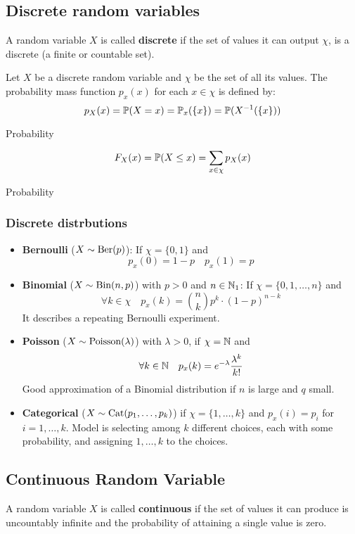 \subsection{Discrete random variables}
A random variable \(X\) is called \textbf{discrete} if the set of values it can output \(\chi\), is a discrete (a finite or countable set).

\begin{ddefinition*}
  Let \(X\) be a discrete random variable and \(\chi\) be the set of all its values. The probability mass function \(p_x(x)\) for each \(x \in \chi\) is defined by:
  \[p_X(x) = \P(X = x) = \P_x(\{x\}) = \P(X^{-1}(\{x\}))\]
\end{ddefinition*}
Probability
\begin{ddefinition*}
  \[F_X(x) = \P(X \leq x) = \sum_{x \in \chi} p_X(x)\]
\end{ddefinition*}Probability

\subsubsection{Discrete distrbutions}
\begin{itemize}
  \item \textbf{Bernoulli} (\(X \sim \Ber(p)\)): If \(\chi = \{0, 1\}\) and
  \[p_x(0) = 1 - p \quad p_x(1) = p\]

  \item \textbf{Binomial} (\(X \sim \Bin(n, p)\)) with \(p > 0\) and \(n \in \N_1\): If \(\chi = \{0, 1, \ldots, n\}\) and
  \[\forall k \in \chi \quad p_x(k) = \binom{n}{k} p^k \cdot (1 - p)^{n -k}\]
  It describes a repeating Bernoulli experiment.

  \item \textbf{Poisson} (\(X \sim \Poisson(\lambda)\)) with \(\lambda > 0\), if \(\chi = \N\) and
  \[\forall k \in \N \quad p_x(k) = e^{-\lambda} \frac{\lambda^k}{k!}\]
  Good approximation of a Binomial distribution if \(n\) is large and \(q\) small.

  \item \textbf{Categorical} (\(X \sim \Cat(p_1, \ldots, p_k)\)) if \(\chi = \{1, \ldots, k\}\) and \(p_x(i) = p_i\) for \(i = 1, \ldots, k\). Model is selecting among \(k\) different choices, each with some probability, and assigning \(1, \ldots, k\) to the choices.
\end{itemize}

\pagebreak
\subsection{Continuous Random Variable}
A random variable \(X\) is called \textbf{continuous} if the set of values it can produce is uncountably infinite and the probability of attaining a single value is zero.

